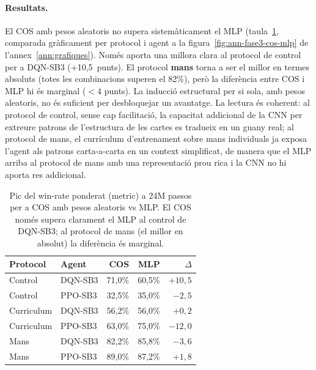 \paragraph{Resultats.} El COS amb pesos aleatoris no supera sistemàticament el \ac{MLP}
(taula~\ref{tab:fase3}, comparada gràficament per protocol i agent a la
figura~\ref{fig:ann-fase3-cos-mlp} de l'annex~\ref{ann:grafiques}). Només aporta una millora
clara al protocol de control per a
DQN-SB3 (+10{,}5~punts). El protocol \textbf{mans} torna a ser el millor en termes
absoluts (totes les combinacions superen el 82\%), però la diferència entre COS i \ac{MLP}
hi és marginal (\(<4\) punts). La inducció estructural per si sola, amb pesos aleatoris,
no és suficient per desbloquejar un avantatge. La lectura és coherent: al protocol de
control, sense cap facilitació, la capacitat addicional de la \ac{CNN} per extreure
patrons de l'estructura de les cartes es tradueix en un guany real; al protocol de mans,
el currículum d'entrenament sobre mans individuals ja exposa l'agent als patrons
carta-a-carta en un context simplificat, de manera que el \ac{MLP} arriba al protocol
de mans amb una representació prou rica i la \ac{CNN} no hi aporta res addicional.

\begin{table}[H]
  \centering
  \begin{tabular}{llrrr}
    \toprule
    Protocol & Agent & COS & \ac{MLP} & $\Delta$ \\
    \midrule
    Control    & DQN-SB3 & 71{,}0\% & 60{,}5\% & $+10{,}5$ \\
    Control    & PPO-SB3 & 32{,}5\% & 35{,}0\% & $-2{,}5$ \\
    Curriculum & DQN-SB3 & 56{,}2\% & 56{,}0\% & $+0{,}2$ \\
    Curriculum & PPO-SB3 & 63{,}0\% & 75{,}0\% & $-12{,}0$ \\
    Mans       & DQN-SB3 & 82{,}2\% & 85{,}8\% & $-3{,}6$ \\
    Mans       & PPO-SB3 & 89{,}0\% & 87{,}2\% & $+1{,}8$ \\
    \bottomrule
  \end{tabular}
  \caption[Win-rate de COS amb pesos aleatoris vs MLP (Fase~3).]{Pic del win-rate ponderat (\(\text{metric}\)) a 24M passos per a COS amb pesos
           aleatoris vs \ac{MLP}. El COS només supera clarament el \ac{MLP} al control de
           DQN-SB3; al protocol de mans (el millor en absolut) la diferència és marginal.}
  \label{tab:fase3}
\end{table}

